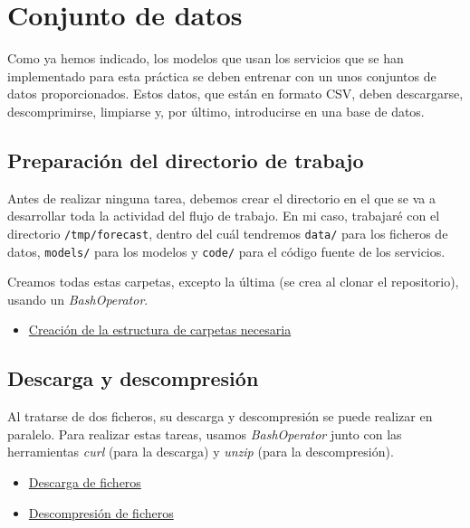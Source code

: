 \section{Conjunto de datos}
Como ya hemos indicado, los modelos que usan los servicios que
se han implementado para esta práctica se deben entrenar con un unos
conjuntos de datos proporcionados. Estos datos, que están en formato
CSV, deben descargarse, descomprimirse, limpiarse y, por último,
introducirse en una base de datos.

\subsection{Preparación del directorio de trabajo}
Antes de realizar ninguna tarea, debemos crear el directorio en el que
se va a desarrollar toda la actividad del flujo de trabajo. En mi caso,
trabajaré con el directorio \lstinline{/tmp/forecast}, dentro del cuál
tendremos \lstinline{data/} para los ficheros de datos, \lstinline{models/}
para los modelos y \lstinline{code/} para el código fuente de los servicios.

Creamos todas estas carpetas, excepto la última (se crea al clonar el
repositorio), usando un \textit{BashOperator}.

\begin{itemize}
    \item\href{
        https://github.com/Varrrro/forecast/blob/master/airflow/tasks.py#L36-L41
    }{Creación de la estructura de carpetas necesaria}
\end{itemize}

\subsection{Descarga y descompresión}
Al tratarse de dos ficheros, su descarga y descompresión se puede
realizar en paralelo. Para realizar estas tareas, usamos \textit{BashOperator}
junto con las herramientas \textit{curl} (para la descarga) y
\textit{unzip} (para la descompresión).

\begin{itemize}
    \item\href{
        https://github.com/Varrrro/forecast/blob/master/airflow/tasks.py#L43-L55
    }{Descarga de ficheros}
    \item\href{
        https://github.com/Varrrro/forecast/blob/master/airflow/tasks.py#L57-L69
    }{Descompresión de ficheros}
\end{itemize}

